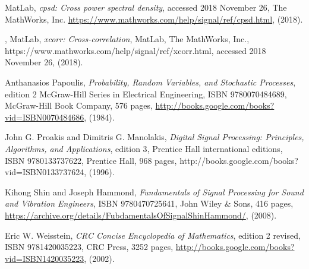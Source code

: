 \begin{thebibliography}{99}
        {MatLab},
         \emph{cpsd: Cross power spectral density},
         {accessed 2018 November 26},
         {The MathWorks, Inc.}
         \url{https://www.mathworks.com/help/signal/ref/cpsd.html},
         (2018).

,
        {MatLab},
        \emph{xcorr: Cross-correlation},
        {MatLab},
        {The MathWorks, Inc.},
        {https://www.mathworks.com/help/signal/ref/xcorr.html},
        {accessed 2018 November 26},
        (2018).

        {Anthanasios Papoulis},
         \emph{Probability, Random Variables, and Stochastic Processes}, edition 2
         {McGraw-Hill Series in Electrical Engineering},
         ISBN {9780070484689}, {McGraw-Hill Book Company}, 576 pages,
         \url{http://books.google.com/books?vid=ISBN0070484686},
         (1984).

        {John G. Proakis and Dimitris G. Manolakis},
        \emph{Digital Signal Processing: Principles, Algorithms, and Applications},
        {edition 3},
        {Prentice Hall international editions},
        ISBN {9780133737622},
        {Prentice Hall},
        968 pages,
        {http://books.google.com/books?vid=ISBN0133737624},
        (1996).

  {Kihong Shin and Joseph Hammond},
  \emph{Fundamentals of Signal Processing for Sound and Vibration Engineers},
  {ISBN 9780470725641},
  {John Wiley \& Sons},
  {416 pages},
  \url{https://archive.org/details/FubdamentalsOfSignalShinHammond/},
  (2008).

        {Eric W. Weisstein},
        \emph{CRC Concise Encyclopedia of Mathematics}, 
        edition 2 revised,
        ISBN {9781420035223}, {CRC Press}, 3252 pages,
        \url{http://books.google.com/books?vid=ISBN1420035223},
        (2002).

\end{thebibliography}
